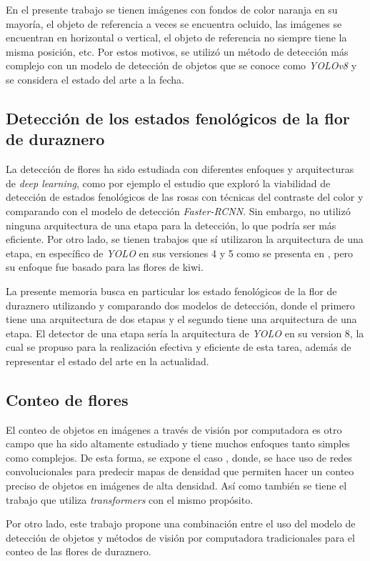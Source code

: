 En el presente trabajo se tienen imágenes con fondos de color naranja en su mayoría, el objeto de referencia a veces se encuentra ocluido, las imágenes se encuentran en horizontal o vertical, el objeto de referencia no siempre tiene la misma posición, etc. Por estos motivos, se utilizó un método de detección más complejo con un modelo de detección de objetos que se conoce como \textit{YOLOv8} y se considera el estado del arte a la fecha.

\subsection{Detección de los estados fenológicos de la flor de duraznero}
 
La detección de flores ha sido estudiada con diferentes enfoques y arquitecturas de \textit{deep learning}, como por ejemplo el estudio \cite{ARTICLE:3} que exploró la viabilidad de detección de estados fenológicos de las rosas con técnicas del contraste del color y comparando con el modelo de detección \textit{Faster-RCNN}. Sin embargo, no utilizó ninguna arquitectura de una etapa para la detección, lo que podría ser más eficiente. Por otro lado, se tienen trabajos que sí utilizaron la arquitectura de una etapa, en específico de \textit{YOLO} en sus versiones 4 y 5 como se presenta en \cite{ARTICLE:4} \cite{ARTICLE:5}, pero su enfoque fue basado para las flores de kiwi.

La presente memoria busca en particular los estado fenológicos de la flor de duraznero utilizando y comparando dos modelos de detección, donde el primero tiene una arquitectura de dos etapas y el segundo tiene una arquitectura de una etapa. El detector de una etapa sería la arquitectura de \textit{YOLO} en su version 8, la cual se propuso para la realización efectiva y eficiente de esta tarea, además de representar el estado del arte en la actualidad.

\subsection{Conteo de flores}

El conteo de objetos en imágenes a través de visión por computadora es otro campo que ha sido altamente estudiado y tiene muchos enfoques tanto simples como complejos. De esta forma, se expone el caso \cite{ARTICLE:6}, donde, se hace uso de redes convolucionales para predecir mapas de densidad que permiten hacer un conteo preciso de objetos en imágenes de alta densidad. Así como también se tiene el trabajo \cite{ARTICLE:7} que utiliza \textit{transformers} con el mismo propósito.

Por otro lado, este trabajo propone una combinación entre el uso del modelo de detección de objetos y métodos de visión por computadora tradicionales para el conteo de las flores de duraznero.





